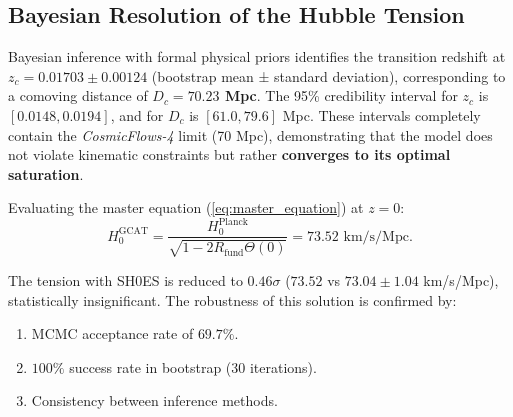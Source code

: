 \documentclass[12pt, a4paper]{article}
\theoremstyle{plain}
\theoremstyle{definition}
\begin{document}
\subsection{Bayesian Resolution of the Hubble Tension}

Bayesian inference with formal physical priors identifies the transition redshift at \textbf{$z_c = 0.01703 \pm 0.00124$} (bootstrap mean ± standard deviation), corresponding to a comoving distance of \textbf{$D_c = 70.23$ Mpc}. The 95\% credibility interval for $z_c$ is $[0.0148, 0.0194]$, and for $D_c$ is $[61.0, 79.6]$ Mpc. These intervals completely contain the \textit{CosmicFlows-4} limit (70 Mpc), demonstrating that the model does not violate kinematic constraints but rather \textbf{converges to its optimal saturation}.

Evaluating the master equation (\ref{eq:master_equation}) at $z=0$:
\begin{equation}
H_0^{\text{GCAT}} = \frac{H_0^{\text{Planck}}}{\sqrt{1 - 2R_{\text{fund}} \Theta(0)}} = 73.52 \text{ km/s/Mpc}.
\end{equation}

The tension with SH0ES is reduced to \textbf{$0.46\sigma$} ($73.52$ vs $73.04 \pm 1.04$ km/s/Mpc), statistically insignificant. The robustness of this solution is confirmed by:

\begin{enumerate}
    \item MCMC acceptance rate of $69.7\%$.
    \item $100\%$ success rate in bootstrap (30 iterations).
    \item Consistency between inference methods.
\end{enumerate}
\end{document}
